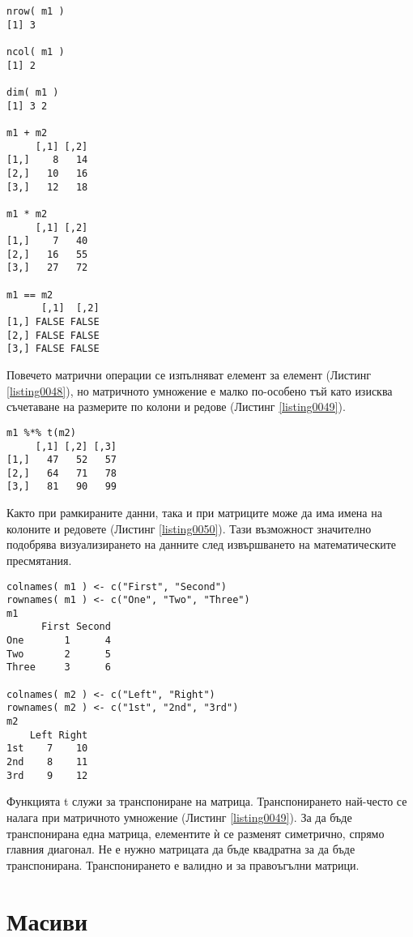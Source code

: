 \begin{lstlisting}[caption=Операции с матрици, label=listing0048]
nrow( m1 )
[1] 3

ncol( m1 )
[1] 2

dim( m1 )
[1] 3 2

m1 + m2
     [,1] [,2]
[1,]    8   14
[2,]   10   16
[3,]   12   18
 
m1 * m2
     [,1] [,2]
[1,]    7   40
[2,]   16   55
[3,]   27   72

m1 == m2
      [,1]  [,2]
[1,] FALSE FALSE
[2,] FALSE FALSE
[3,] FALSE FALSE
\end{lstlisting}

Повечето матрични операции се изпълняват елемент за елемент (Листинг \ref{listing0048}), но матричното умножение е малко по-особено тъй като изисква съчетаване на размерите по колони и редове (Листинг \ref{listing0049}).

\begin{lstlisting}[caption=Матрично умножение, label=listing0049]
m1 %*% t(m2)
     [,1] [,2] [,3]
[1,]   47   52   57
[2,]   64   71   78
[3,]   81   90   99
\end{lstlisting}

Както при рамкираните данни, така и при матриците може да има имена на колоните и редовете (Листинг \ref{listing0050}). Тази възможност значително подобрява визуализирането на данните след извършването на математическите пресмятания.

\begin{lstlisting}[caption=Имена на колоните и редовете, label=listing0050]
colnames( m1 ) <- c("First", "Second")
rownames( m1 ) <- c("One", "Two", "Three")
m1
      First Second
One       1      4
Two       2      5
Three     3      6

colnames( m2 ) <- c("Left", "Right")
rownames( m2 ) <- c("1st", "2nd", "3rd")
m2
    Left Right
1st    7    10
2nd    8    11
3rd    9    12
\end{lstlisting}

Функцията t служи за транспониране на матрица. Транспонирането най-често се налага при матричното умножение (Листинг \ref{listing0049}). За да бъде транспонирана една матрица, елементите ѝ се разменят симетрично, спрямо главния диагонал. Не е нужно матрицата да бъде квадратна за да бъде транспонирана. Транспонирането е валидно и за правоъгълни матрици.

\section{Масиви}


